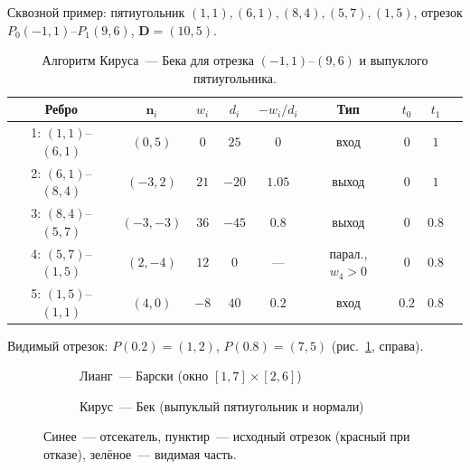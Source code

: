 \documentclass[11pt,a4paper]{article}
\begin{document}
Сквозной пример: пятиугольник $(1,1), (6,1), (8,4), (5,7), (1,5)$,
отрезок $P_0(-1,1)$--$P_1(9,6)$, $\mathbf{D} = (10, 5)$.

\begin{table}[H]
\centering\small
\caption{Алгоритм Кируса~— Бека для отрезка $(-1,1)$--$(9,6)$ и выпуклого пятиугольника.}
\begin{tabular}{ccccccccc}
\toprule
Ребро & $\mathbf{n}_i$ & $w_i$ & $d_i$ & $-w_i/d_i$ & Тип & $t_0$ & $t_1$ \\
\midrule
1: $(1,1)$--$(6,1)$ & $(0, 5)$   & $0$   & $25$  & $0$     & вход  & $0$   & $1$ \\
2: $(6,1)$--$(8,4)$ & $(-3, 2)$  & $21$  & $-20$ & $1.05$  & выход & $0$   & $1$ \\
3: $(8,4)$--$(5,7)$ & $(-3, -3)$ & $36$  & $-45$ & $0.8$   & выход & $0$   & $0.8$ \\
4: $(5,7)$--$(1,5)$ & $(2, -4)$  & $12$  & $0$   & ---     & парал., $w_4 > 0$ & $0$ & $0.8$ \\
5: $(1,5)$--$(1,1)$ & $(4, 0)$   & $-8$  & $40$  & $0.2$   & вход  & $0.2$ & $0.8$ \\
\bottomrule
\end{tabular}
\end{table}
Видимый отрезок: $P(0.2) = (1, 2)$, $P(0.8) = (7, 5)$ (рис.~\ref{fig:examples}, справа).

\begin{figure}[H]
\centering
\begin{subfigure}[b]{0.48\linewidth}\centering\resizebox{\linewidth}{!}{}\caption{Лианг~— Барски (окно $[1,7]\times[2,6]$)}\end{subfigure}\hfill
\begin{subfigure}[b]{0.48\linewidth}\centering\resizebox{\linewidth}{!}{}\caption{Кирус~— Бек (выпуклый пятиугольник и нормали)}\end{subfigure}
\caption{Синее~— отсекатель, пунктир~— исходный отрезок (красный при отказе), зелёное~— видимая часть.}
\label{fig:examples}
\end{figure}
\end{document}
